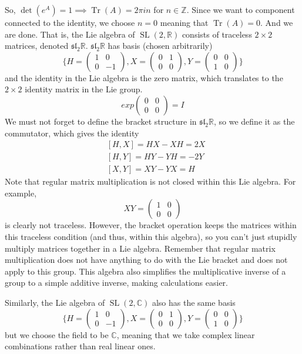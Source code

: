 \documentclass{article}
\DeclareMathOperator{\Tr}{Tr}
\DeclareMathOperator{\SL}{SL}
\theoremstyle{remark}
\theoremstyle{definition}
\begin{document}
So, $\det{(e^A)} = 1 \implies \Tr{(A)} = 2 \pi i n$ for $n \in \mathbb{Z}$. Since we want to component connected to the identity, we choose $n=0$ meaning that $\Tr{(A)} = 0$. And we are done. That is, the Lie algebra of $\SL(2, \mathbb{R})$ consists of traceless $2 \times 2$ matrices, denoted $\mathfrak{sl}_2 \mathbb{R}$. $\mathfrak{sl}_2 \mathbb{R}$ has basis (chosen arbitrarily) 
\[\bigg\{ H = \begin{pmatrix}
1&0\\0&-1
\end{pmatrix}, X = \begin{pmatrix}
0&1\\0&0
\end{pmatrix}, Y = \begin{pmatrix}
0&0\\1&0
\end{pmatrix}\bigg\}\]
and the identity in the Lie algebra is the zero matrix, which translates to the $2 \times 2$ identity matrix in the Lie group. 
\[exp \begin{pmatrix}
0&0\\0&0
\end{pmatrix} = I\]
We must not forget to define the bracket structure in $\mathfrak{sl}_2 \mathbb{R}$, so we define it as the commutator, which gives the identity
\begin{align*}
    & [H,X] = HX - XH = 2X \\
    & [H,Y] = HY - YH = -2Y \\
    & [X,Y] = XY - YX = H
\end{align*}
Note that regular matrix multiplication is not closed within this Lie algebra. For example, 
\[X Y = \begin{pmatrix}
1&0\\0&0
\end{pmatrix}\]
is clearly not traceless. However, the bracket operation keeps the matrices within this traceless condition (and thus, within this algebra), so you can't just stupidly multiply matrices together in a Lie algebra. Remember that regular matrix multiplication does not have anything to do with the Lie bracket and does not apply to this group. This algebra also simplifies the multiplicative inverse of a group to a simple additive inverse, making calculations easier. 

Similarly, the Lie algebra of $\SL(2, \mathbb{C})$ also has the same basis 
\[\bigg\{ H = \begin{pmatrix}
1&0\\0&-1
\end{pmatrix}, X = \begin{pmatrix}
0&1\\0&0
\end{pmatrix}, Y = \begin{pmatrix}
0&0\\1&0
\end{pmatrix}\bigg\}\]
but we choose the field to be $\mathbb{C}$, meaning that we take complex linear combinations rather than real linear ones. 
\end{document}
